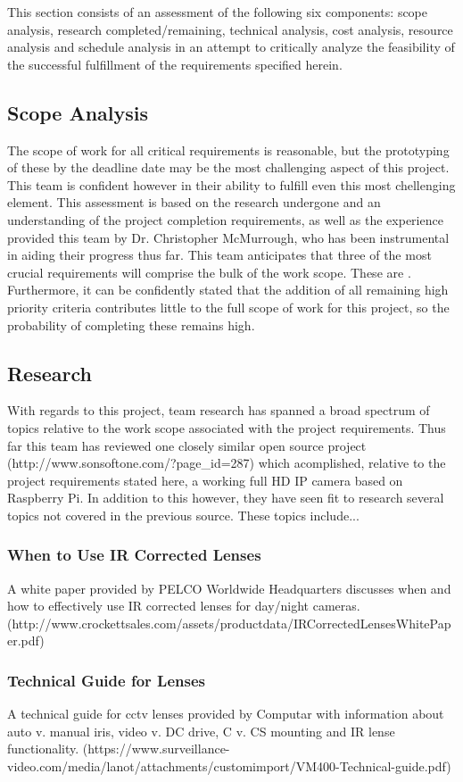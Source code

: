 This section consists of an assessment of the following six components: scope analysis, research completed/remaining, technical analysis, cost analysis, resource analysis and schedule analysis in an attempt to critically analyze the feasibility of the successful fulfillment of the requirements specified herein.
\subsection{Scope Analysis}
The scope of work for all critical requirements is reasonable, but the prototyping of these by the deadline date may be the most challenging aspect of this project. This team is confident however in their ability to fulfill even this most chellenging element. This assessment is based on the research undergone and an understanding of the project completion requirements, as well as the experience provided this team by Dr. Christopher McMurrough, who has been instrumental in aiding their progress thus far. This team anticipates that three of the most crucial requirements will comprise the bulk of the work scope. These are{ }. Furthermore, it can be confidently stated that the addition of all remaining high priority criteria contributes little to the full scope of work for this project, so the probability of completing these remains high.
\subsection{Research}
With regards to this project, team research has spanned a broad spectrum of topics relative to the work scope associated with the project requirements. Thus far this team has reviewed one closely similar open source project (http://www.sonsoftone.com/?page_id=287) which acomplished, relative to the project requirements stated here, a working full HD IP camera based on Raspberry Pi. In addition to this however, they have seen fit to research several topics not covered in the previous source. These topics include...
\subsubsection{When to Use IR Corrected Lenses}
A white paper provided by PELCO Worldwide Headquarters discusses when and how to effectively use IR corrected lenses for day/night cameras. (http://www.crockettsales.com/assets/productdata/IRCorrectedLensesWhitePaper.pdf)
\subsubsection{Technical Guide for Lenses}
A technical guide for cctv lenses provided by Computar with information about auto v. manual iris, video v. DC drive, C v. CS mounting and IR lense functionality. (https://www.surveillance-video.com/media/lanot/attachments/customimport/VM400-Technical-guide.pdf)
